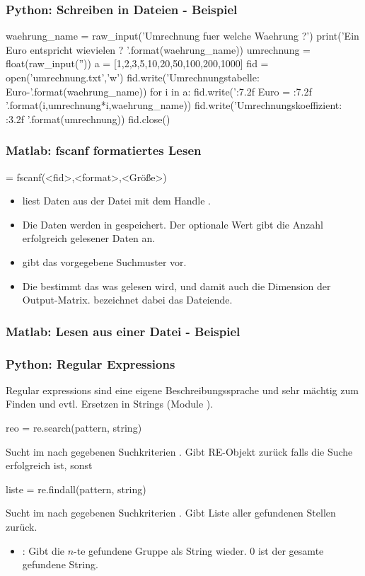 \documentclass[hyperref={xetex}]{beamer}
\begin{document}
%
\begin{frame}[fragile]\frametitle{}
\end{frame}
%
\begin{frame}[fragile]\frametitle{Python: Schreiben in Dateien - Beispiel}
  \begin{pyin}
waehrung_name = raw_input('Umrechnung fuer welche Waehrung ?')
print('Ein Euro entspricht wievielen {} ? '.format(waehrung_name))
umrechnung = float(raw_input(''))
a = [1,2,3,5,10,20,50,100,200,1000]
fid = open('umrechnung.txt','w')
fid.write('Umrechnungstabelle: Euro-{}\n\n'.format(waehrung_name))
for i in a:
  fid.write('{:7.2f} Euro = {:7.2f} {}\n'.format(i,umrechnung*i,waehrung_name))
fid.write('\n\n Umrechnungskoeffizient: {:3.2f} \n'.format(umrechnung))
fid.close()    
  \end{pyin}
\end{frame}
%
%
\begin{frame}[fragile]\frametitle{Matlab: fscanf formatiertes Lesen}
\begin{matlabin}
 = fscanf(<fid>,<format>,<Größe>)
\end{matlabin}
\begin{itemize}
\item {} liest Daten aus der Datei mit dem Handle
  . 
\item Die Daten werden in  gespeichert. Der optionale Wert
   gibt die Anzahl erfolgreich gelesener Daten an.
\item {} gibt das vorgegebene Suchmuster vor.
\item Die  bestimmt das was gelesen wird, und damit auch die Dimension der Output-Matrix.  bezeichnet dabei das Dateiende.
\end{itemize}
\end{frame}
%
%
\begin{frame}[fragile]\frametitle{Matlab: Lesen aus einer Datei - Beispiel}
\end{frame}
%
%
\begin{frame}[fragile]\frametitle{Python: Regular Expressions}
Regular expressions sind eine eigene Beschreibungssprache und sehr mächtig
zum Finden und evtl. Ersetzen in Strings (Module ).

\begin{pyin}
reo = re.search(pattern, string)
\end{pyin}
Sucht im  nach gegebenen Suchkriterien . Gibt RE-Objekt zurück falls die Suche erfolgreich ist, sonst 
\begin{pyin}
liste = re.findall(pattern, string)
\end{pyin}
Sucht im  nach gegebenen Suchkriterien . Gibt Liste aller gefundenen Stellen zurück.
\begin{itemize}
  \item {}: Gibt die $n$-te gefundene Gruppe als String wieder. $0$ ist der gesamte gefundene String.
\end{itemize}
\end{frame}
\end{document}
